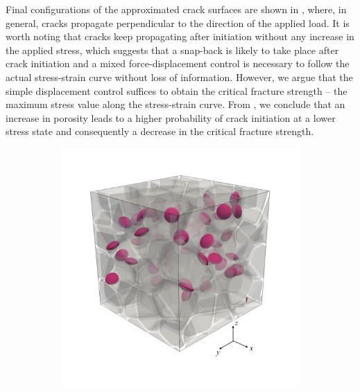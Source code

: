 Final configurations of the approximated crack surfaces are shown in , where, in general, cracks propagate perpendicular to the direction of the applied load.
It is worth noting that cracks keep propagating after initiation without any increase in the applied stress, which suggests that a snap-back is likely to take place after crack initiation and a mixed force-displacement control is necessary to follow the actual stress-strain curve without loss of information. However, we argue that the simple displacement control suffices to obtain the critical fracture strength -- the maximum stress value along the stress-strain curve. From , we conclude that an increase in porosity leads to a higher probability of crack initiation at a lower stress state and consequently a decrease in the critical fracture strength.
\begin{figure}[!htb]
  \centering
  \begin{subfigure}{0.32\textwidth}
    \centering
    \includegraphics[width=\textwidth]{Chapter3/figures/b50_ini_new}
    \caption{}
    \label{b50_ini}
  \end{subfigure}
  \begin{subfigure}{0.32\textwidth}
    \centering

\end{subfigure}
\end{figure}
